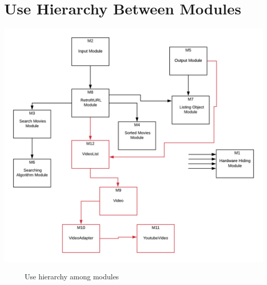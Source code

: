 \documentclass[12pt, titlepage]{article}
\begin{document}
\section{Use Hierarchy Between Modules} \label{SecUse}

\includegraphics{3}

\begin{figure}[H]
\centering
\caption{Use hierarchy among modules}
\label{FigUH}
\end{figure}
\end{document}
